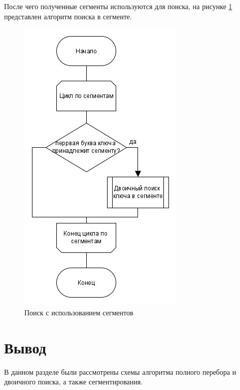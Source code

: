 После чего полученные сегменты используются для поиска, на рисунке \ref{fig:segsearch} представлен алгоритм поиска в сегменте.
\begin{figure}
	\centering
	\includegraphics[width=0.5\linewidth]{src/segsearch}
	\caption{Поиск с использованием сегментов}
	\label{fig:segsearch}
\end{figure}


\section{Вывод}
\label{sec:design_conclusion}
В данном разделе были рассмотрены схемы алгоритма полного перебора и двоичного поиска, а также сегментирования.